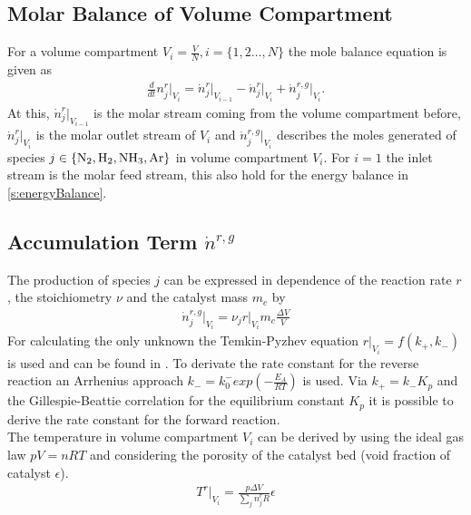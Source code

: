 \documentclass[paper=letter, fontsize=12pt]{article}
\begin{document}
\subsection{Molar Balance of Volume Compartment}
For a volume compartment  $V_i=\frac{V}{N}, i=\lbrace 1,2 \dots, N \rbrace$ the mole balance equation is given as
\begin{align}
\frac{d}{dt} n^r_j \Big|_{V_i}= \dot{n}^r_j\Big|_{V_{i-1}} - \dot{n}^r_j\Big|_{V_{i}} + \dot{n}^{r,g}_j\Big|_{V_{i}}. \label{f:molebalance}
\end{align}
At this, $\dot{n}^r_j\Big|_{V_{i-1}}$ is the molar stream coming from the volume compartment before, $\dot{n}^r_j\Big|_{V_{i}}$ is the molar outlet stream of $V_i$ and $\dot{n}^{r,g}_j\Big|_{V_{i}}$ describes the moles generated of species $j \in \lbrace \ce{N2}, \ce{H2}, \ce{NH3}, \ce{Ar} \rbrace$ in volume compartment $V_i$. For $i=1$ the inlet stream is the molar feed stream, this also hold for the energy balance in \autoref{s:energyBalance}. \\

\subsection{Accumulation Term $\dot{n}^{r,g}$ }
The production of species $j$ can be expressed in dependence of the reaction rate $r$, the stoichiometry $\nu$ and the catalyst mass $m_c$ by
\begin{align}
\dot{n}^{r,g}_j\Big|_{V_{i}}=\nu_j r\Big|_{V_i} m_c \frac{\Delta V}{V} \label{f:reactionrate}
\end{align}
For calculating the only unknown the Temkin-Pyzhev equation $r \Big|_{V_i}=f\left( k_+, k_- \right)$ is used and can be found in \cite{Jinasena2016}. To derivate the rate constant for the reverse reaction an Arrhenius approach \cite[p. 148]{Kamp1988} $k_-=k^-_0 exp\left( - \frac{E_{A}}{RT} \right)$ is used. Via $k_+=k_- K_p$ and the Gillespie-Beattie correlation for the equilibrium constant $K_p$ it is possible to derive the rate constant for the forward reaction.\\
The temperature in volume compartment $V_i$ can be derived by using the ideal gas law $pV=nRT$ and considering the porosity of the catalyst bed (void fraction of catalyst $\epsilon$).
\begin{align}
T^r \Big|_{V_i}=\frac{p \Delta V}{\sum_j n^r_j R} \epsilon \label{f:temperatureReactor}
\end{align}
\end{document}

